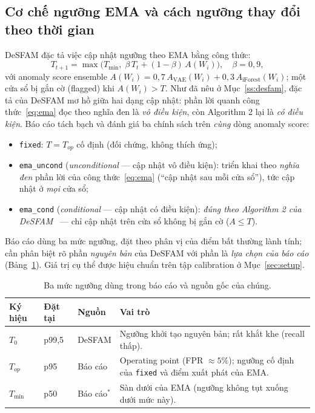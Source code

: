 \subsection{Cơ chế ngưỡng EMA và cách ngưỡng thay đổi theo thời gian}
DeSFAM đặc tả việc cập nhật ngưỡng theo EMA bằng công thức:
\begin{equation}
T_{t+1} = \max\!\big(T_{\min},\; \beta\,T_t + (1-\beta)\,A(W_i)\big),\quad \beta=0{,}9,
\label{eq:ema}
\end{equation}
với anomaly score ensemble $A(W_i)=0{,}7\,A_{\text{VAE}}(W_i)+0{,}3\,A_{\text{iForest}}(W_i)$; một cửa sổ bị gắn cờ (flagged) khi $A(W_i)>T$. Như đã nêu ở Mục~\ref{ss:desfam}, đặc tả của DeSFAM mơ hồ giữa hai dạng cập nhật: phần lời quanh công thức~\eqref{eq:ema} đọc theo nghĩa đen là \textit{vô điều kiện}, còn Algorithm 2 lại là \textit{có điều kiện}. Báo cáo tách bạch và đánh giá ba chính sách trên \textit{cùng} dòng anomaly score:
\begin{itemize}[leftmargin=1.2cm]
\item \texttt{fixed}: $T=T_{op}$ cố định (đối chứng, không thích ứng);
\item \texttt{ema\_uncond} (\textit{unconditional} — cập nhật vô điều kiện): triển khai theo \textit{nghĩa đen} phần lời của công thức~\eqref{eq:ema} (``cập nhật sau mỗi cửa sổ''), tức cập nhật ở \textit{mọi} cửa sổ;
\item \texttt{ema\_cond} (\textit{conditional} — cập nhật có điều kiện): \textit{đúng theo Algorithm 2 của DeSFAM}~\cite{desfam_original} — chỉ cập nhật trên cửa sổ không bị gắn cờ ($A\le T$).
\end{itemize}

Báo cáo dùng ba mức ngưỡng, đặt theo phân vị của điểm bất thường lành tính; cần phân biệt rõ phần \textit{nguyên bản} của DeSFAM với phần là \textit{lựa chọn của báo cáo} (Bảng~\ref{tab:thresholds}). Giá trị cụ thể được hiệu chuẩn trên tập calibration ở Mục~\ref{sec:setup}.

\begin{table}[ht]
\caption{Ba mức ngưỡng dùng trong báo cáo và nguồn gốc của chúng.}
\label{tab:thresholds}
\centering
\begin{tabular}{@{}l l l p{5.4cm}@{}}
\toprule
\textbf{Ký hiệu} & \textbf{Đặt tại} & \textbf{Nguồn} & \textbf{Vai trò} \\
\midrule
$T_0$      & p99,5 & DeSFAM & Ngưỡng khởi tạo nguyên bản; rất khắt khe (recall thấp). \\
$T_{op}$   & p95   & Báo cáo & Operating point (FPR $\approx 5\%$); ngưỡng cố định của \texttt{fixed} và điểm xuất phát của EMA. \\
$T_{\min}$ & p50   & Báo cáo$^{\ast}$ & Sàn dưới của EMA (ngưỡng không tụt xuống dưới mức này). \\
\bottomrule
\end{tabular}
\par{}
\end{table}

